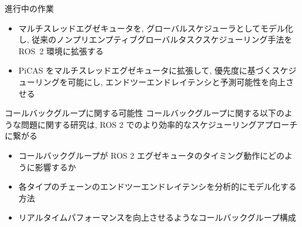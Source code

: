 \begin{frame}{進行中の作業}
    \begin{itemize}
        \item マルチスレッドエグゼキュータを, グローバルスケジューラとしてモデル化し, 従来のノンプリエンプティブグローバルタスクスケジューリング手法を ROS~2 環境に拡張する
        \item PiCAS をマルチスレッドエグゼキュータに拡張して, 優先度に基づくスケジューリングを可能にし, エンドツーエンドレイテンシと予測可能性を向上させる
    \end{itemize}
\end{frame}

\begin{frame}{コールバックグループに関する可能性}
    コールバックグループに関する以下のような問題に関する研究は, ROS 2 でのより効率的なスケジューリングアプローチに繋がる
    \begin{itemize}
        \item コールバックグループが ROS 2 エグゼキュータのタイミング動作にどのように影響するか
        \item 各タイプのチェーンのエンドツーエンドレイテンシを分析的にモデル化する方法
        \item リアルタイムパフォーマンスを向上させるようなコールバックグループ構成
    \end{itemize}
\end{frame}
